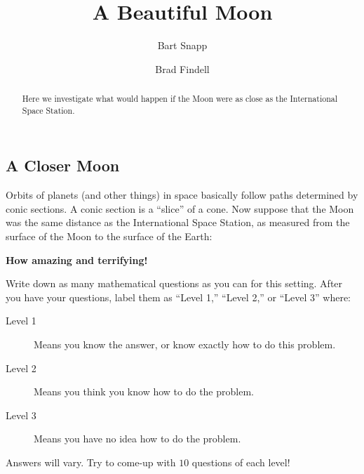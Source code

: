 \documentclass{ximera}
\title{A Beautiful Moon}
\author{Bart Snapp \and Brad Findell}
\begin{document}
\begin{abstract}
Here we investigate what would happen if the Moon were as close as the
International Space Station.
\end{abstract}
\maketitle

\subsection{A Closer Moon}

Orbits of planets (and other things) in space basically follow paths
determined by conic sections. A conic section is a ``slice'' of a
cone. Now suppose that the Moon was the same distance as the International
Space Station, as measured from the surface of the Moon to the surface
of the Earth: 

\begin{center}
\textbf{How amazing and terrifying!}
\end{center}
\begin{problem}
     Write down as many mathematical questions as you can for this
     setting. After you have your questions, label them as ``Level
     1,'' ``Level 2,'' or ``Level 3'' where:
\begin{description}
\item[Level 1] Means you know the answer, or know exactly how to do
  this problem.
\item[Level 2] Means you think you know how to do the problem.
\item[Level 3] Means you have no idea how to do the problem.
\end{description}
\begin{freeResponse}
  Answers will vary. Try to come-up with $10$ questions of each level!
\end{freeResponse}
\end{problem}
\end{document}
